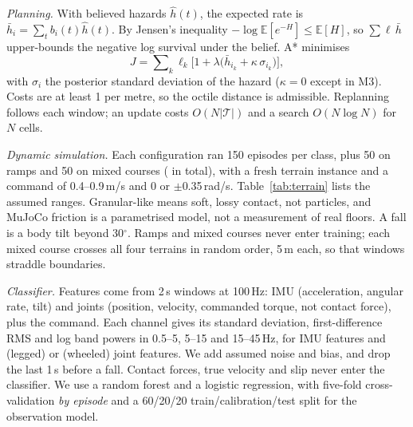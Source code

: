 \documentclass[conference,a4paper]{IEEEtran}
\makeatletter
\newcommand{\sentbreak}{\par\pagebreak\noindent}  %
\def\section{\@startsection{section}{1}{\z@}{1.5ex}{0.7ex}{\normalfont\normalsize\centering\scshape}}
\makeatother
\begin{document}
\sentbreak \emph{Planning.} With believed hazards $\hat h(t)$, the expected rate is $\bar h_i=\sum_t b_i(t)\hat h(t)$. By Jensen's inequality $-\log\mathbb{E}[e^{-H}]\leq\mathbb{E}[H]$, so $\sum\ell\,\bar h$ upper-bounds the negative log survival under the belief. A* minimises
\begin{equation}
J=\sum\nolimits_k\ell_k\bigl[1+\lambda\bigl(\bar h_{i_k}+\kappa\,\sigma_{i_k}\bigr)\bigr],
\label{eq:cost}
\end{equation}
with $\sigma_i$ the posterior standard deviation of the hazard ($\kappa=0$ except in M3). Costs are at least 1 per metre, so the octile distance is admissible. Replanning follows each window; an update costs $O(N|\mathcal{T}|)$ and a search $O(N\log N)$ for $N$ cells.


\section{Experimental Setup}
\emph{Dynamic simulation.} Each configuration ran 150 episodes per class, plus 50 on ramps and 50 on mixed courses (\vnEpisodesTotal{} in total), with a fresh terrain instance and a command of 0.4--0.9\,m/s and 0 or $\pm$0.35\,rad/s. Table~\ref{tab:terrain} lists the assumed ranges. Granular-like means soft, lossy contact, not particles, and MuJoCo friction is a parametrised model, not a measurement of real floors. A fall is a body tilt beyond 30$^\circ$. Ramps and mixed courses never enter training; each mixed course crosses all four terrains in random order, 5\,m each, so that windows straddle boundaries.

\begin{table}[t]
\centering
\caption{Terrain Parameters per Class (Assumed Ranges)}
\label{tab:terrain}
\scriptsize
\resizebox{\columnwidth}{!}{}
\end{table}

\sentbreak \emph{Classifier.} Features come from 2\,s windows at 100\,Hz: IMU (acceleration, angular rate, tilt) and joints (position, velocity, commanded torque, not contact force), plus the command. Each channel gives its standard deviation, first-difference RMS and log band powers in 0.5--5, 5--15 and 15--45\,Hz, for \vdimImuLeg{} IMU features and \vdimJointLeg{} (legged) or \vdimJointWhe{} (wheeled) joint features. We add assumed noise and bias, and drop the last 1\,s before a fall. Contact forces, true velocity and slip never enter the classifier. We use a random forest and a logistic regression, with five-fold cross-validation \emph{by episode} and a 60/20/20 train/calibration/test split for the observation model.
\end{document}
